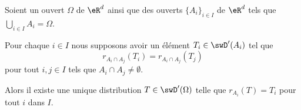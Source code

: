 \begin{proposition}		\label{PROPooDVYNooKquEUl}
	Soient un ouvert \( \Omega\) de \( \eR^d\) ainsi que des ouverts \( \{ A_i \}_{i\in I}\) de \( \eR^d\) tels que \( \bigcup_{i\in I}A_i=\Omega\).

	Pour chaque \( i\in I\) nous supposons avoir un élément \( T_i\in\swD'(A_i)\) tel que
	\begin{equation}
		r_{A_i\cap A_j}(T_i)=r_{A_i\cap A_j}(T_j)
	\end{equation}
	pour tout \( i,j\in I\) tels que \( A_i\cap A_j\neq \emptyset\).

	Alors il existe une unique distribution \( T\in \swD'(\Omega)\) telle que \( r_{A_i}(T)=T_i\) pour tout \( i\) dans \( I\).
\end{proposition}

